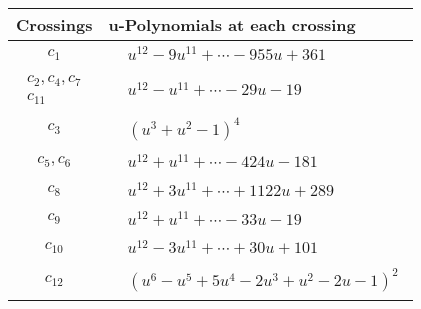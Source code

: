 \documentclass[1p]{elsarticle_modified}
\theoremstyle{definition}
\begin{document}
\begin{tabular}{m{50pt}|m{274pt}}
Crossings & \hspace{64pt}u-Polynomials at each crossing \\
\hline $$\begin{aligned}c_{1}\end{aligned}$$&$\begin{aligned}
&u^{12}-9 u^{11}+\cdots-955 u+361
\end{aligned}$\\
\hline $$\begin{aligned}c_{2},c_{4},c_{7}\\c_{11}\end{aligned}$$&$\begin{aligned}
&u^{12}- u^{11}+\cdots-29 u-19
\end{aligned}$\\
\hline $$\begin{aligned}c_{3}\end{aligned}$$&$\begin{aligned}
&(u^3+u^2-1)^4
\end{aligned}$\\
\hline $$\begin{aligned}c_{5},c_{6}\end{aligned}$$&$\begin{aligned}
&u^{12}+u^{11}+\cdots-424 u-181
\end{aligned}$\\
\hline $$\begin{aligned}c_{8}\end{aligned}$$&$\begin{aligned}
&u^{12}+3 u^{11}+\cdots+1122 u+289
\end{aligned}$\\
\hline $$\begin{aligned}c_{9}\end{aligned}$$&$\begin{aligned}
&u^{12}+u^{11}+\cdots-33 u-19
\end{aligned}$\\
\hline $$\begin{aligned}c_{10}\end{aligned}$$&$\begin{aligned}
&u^{12}-3 u^{11}+\cdots+30 u+101
\end{aligned}$\\
\hline $$\begin{aligned}c_{12}\end{aligned}$$&$\begin{aligned}
&(u^6- u^5+5 u^4-2 u^3+u^2-2 u-1)^2
\end{aligned}$\\
\hline
\end{tabular}\\~\\
\end{document}
